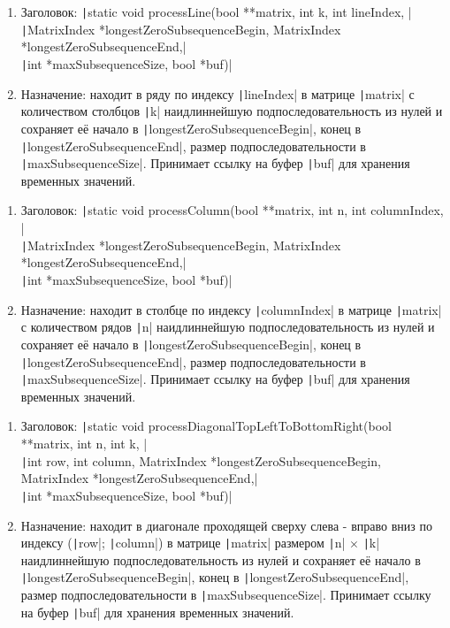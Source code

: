 \documentclass[a4paper, 12pt, oneside]{article}
\begin{document}
    \hline
    \begin{enumerate}
        \item Заголовок:  \texttt|static void processLine(bool **matrix, int k, int lineIndex, |\\
        \texttt|MatrixIndex *longestZeroSubsequenceBegin, MatrixIndex *longestZeroSubsequenceEnd,|\\
        \texttt|int *maxSubsequenceSize, bool *buf)|
        \item Назначение: находит в ряду по индексу \texttt|lineIndex| в матрице \texttt|matrix|
        с количеством столбцов \texttt|k| наидлиннейшую подпоследовательность из нулей и сохраняет её начало в
        \texttt|longestZeroSubsequenceBegin|, конец в \texttt|longestZeroSubsequenceEnd|, размер подпоследовательности в
        \texttt|maxSubsequenceSize|.
        Принимает ссылку на буфер \texttt|buf| для хранения временных значений.
    \end{enumerate}
    \hline
    \begin{enumerate}
        \item Заголовок:  \texttt|static void processColumn(bool **matrix, int n, int columnIndex, |\\
        \texttt|MatrixIndex *longestZeroSubsequenceBegin, MatrixIndex *longestZeroSubsequenceEnd,|\\
        \texttt|int *maxSubsequenceSize, bool *buf)|
        \item Назначение: находит в столбце по индексу \texttt|columnIndex| в матрице \texttt|matrix|
        с количеством рядов \texttt|n| наидлиннейшую подпоследовательность из нулей и сохраняет её начало в
        \texttt|longestZeroSubsequenceBegin|, конец в \texttt|longestZeroSubsequenceEnd|, размер подпоследовательности в
        \texttt|maxSubsequenceSize|.
        Принимает ссылку на буфер \texttt|buf| для хранения временных значений.
    \end{enumerate}
    \hline
    \begin{enumerate}
        \item Заголовок:  \texttt|static void processDiagonalTopLeftToBottomRight(bool **matrix, int n, int k, |\\
        \texttt|int row, int column, MatrixIndex *longestZeroSubsequenceBegin, MatrixIndex *longestZeroSubsequenceEnd,|\\
        \texttt|int *maxSubsequenceSize, bool *buf)|
        \item Назначение: находит в диагонале проходящей сверху слева - вправо вниз по индексу (\texttt|row|; \texttt|column|)
        в матрице \texttt|matrix| размером \texttt|n| $\times$ \texttt|k| наидлиннейшую
        подпоследовательность из нулей и сохраняет её начало в
        \texttt|longestZeroSubsequenceBegin|, конец в \texttt|longestZeroSubsequenceEnd|, размер подпоследовательности в
        \texttt|maxSubsequenceSize|.
        Принимает ссылку на буфер \texttt|buf| для хранения временных значений.
    \end{enumerate}
\end{document}
